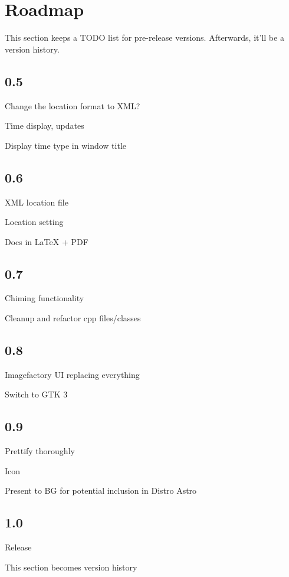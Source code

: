 \section{Roadmap}

This section keeps a TODO list for pre-release versions. Afterwards, it'll be a version history.

\subsection{0.5}

Change the location format to XML?

Time display, updates

Display time type in window title


\subsection{0.6}

XML location file

Location setting

\checkmark Docs in LaTeX + PDF

\subsection{0.7}

Chiming functionality

Cleanup and refactor cpp files/classes

\subsection{0.8}

Imagefactory UI replacing everything

Switch to GTK 3

\subsection{0.9}

Prettify thoroughly

Icon

Present to BG for potential inclusion in Distro Astro

\subsection{1.0}

Release

This section becomes version history

